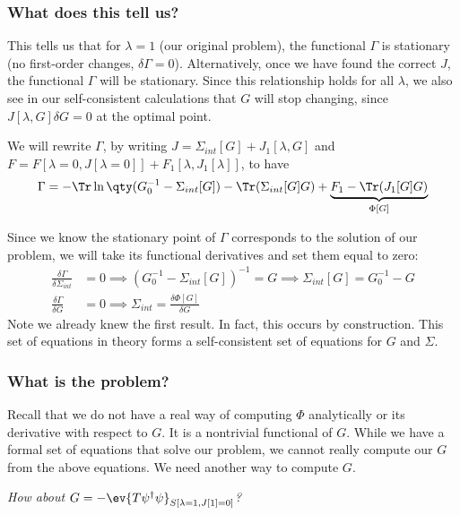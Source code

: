 \documentclass{article}
\begin{document}
\subsubsection*{What does this tell us?}

This tells us that for $\lambda = 1$ (our original problem), the functional $\Gamma$ is stationary (no first-order changes, $\delta \Gamma = 0$). Alternatively, once we have found the correct $J$, the functional $\Gamma$ will be stationary. Since this relationship holds for all $\lambda$, we also see in our self-consistent calculations that $G$ will stop changing, since $J[\lambda, G] \delta G = 0$ at the optimal point. 

We will rewrite $\Gamma$, by writing $J = \Sigma_{int}[G] + J_1[\lambda, G]$ and $F = F[\lambda=0, J[\lambda=0]] + F_1[\lambda, J_1[\lambda]]$, to have
\begin{align*}
  \Gamma = -\Tr \ln \qty(G_0^{-1} - \Sigma_{int}[G]) - \Tr(\Sigma_{int}[G] G) + \underbrace{F_1 - \Tr(J_1 [G] G)}_{\Phi[G]}
\end{align*}


Since we know the stationary point of $\Gamma$ corresponds to the solution of our problem, we will take its functional derivatives and set them equal to zero:
\begin{align}\label{eq:self-consistency}
  \frac{\delta \Gamma}{\delta \Sigma_{int}} & = 0 \implies (G_0^{-1} - \Sigma_{int}[G])^{-1} = G \implies \Sigma_{int}[G] = G_0^{-1} - G \\
  \frac{\delta \Gamma}{\delta G} & = 0 \implies \Sigma_{int} = \frac{\delta \Phi[G]}{\delta G}
\end{align}
Note we already knew the first result. In fact, this occurs by construction. This set of equations in theory forms a self-consistent set of equations for $G$ and $\Sigma$. 

\subsubsection*{What is the problem?}

Recall that we do not have a real way of computing $\Phi$ analytically or its derivative with respect to $G$. It is a nontrivial functional of $G$. While we have a formal set of equations that solve our problem, we cannot really compute our $G$ from the above equations. We need another way to compute $G$.

\textit{How about $G = -\ev{T \psi^\dagger \psi}_{S[\lambda=1, J[1]=0]}$? }
\end{document}
